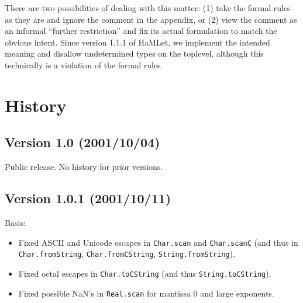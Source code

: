 \documentclass[twoside,titlepage]{article}
\begin{document}
\begin{appendix}
There are two possibilities of dealing with this matter: (1) take the formal rules as they are and ignore the comment in the appendix, or (2) view the comment as an informal ``further restriction'' and fix its actual formulation to match the obvious intent.
Since version 1.1.1 of HaMLet, we implement the intended meaning and disallow undetermined types on the toplevel, although this technically is a violation of the formal rules.


\clearpage
\section{History}
\label{history}

\subsection*{Version 1.0 (2001/10/04)}

Public release. No history for prior versions.

\subsection*{Version 1.0.1 (2001/10/11)}

Basis:
\begin{itemize}[nolistsep]
\item Fixed ASCII and Unicode escapes in {\tt Char.scan} and {\tt Char.scanC} (and thus in {\tt Char.fromString}, {\tt Char.fromCString}, {\tt String.fromString}).
\item Fixed octal escapes in {\tt Char.toCString} (and thus {\tt String.toCString}).
\item Fixed possible NaN's in {\tt Real.scan} for mantissa 0 and large exponents.
\end{itemize}


\end{appendix}
\end{document}
